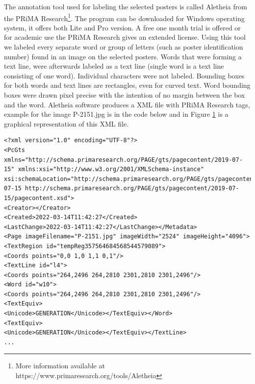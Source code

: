 The annotation tool used for labeling the selected posters is called Aletheia from the PRiMA Research\footnote{More information available at https://www.primaresearch.org/tools/Aletheia}. The program can be downloaded for Windows operating system, it offers both Lite and Pro version. A free one month trial is offered or for academic use the PRiMA Research gives an extended license. Using this tool we labeled every separate word or group of letters (such as poster identification number) found in an image on the selected posters. Words that were forming a text line, were afterwards labeled as a text line (single word is a text line consisting of one word). Individual characters were not labeled. Bounding boxes for both words and text lines are rectangles, even for curved text. Word bounding boxes were drawn pixel precise with the intention of no margin between the box and the word. Aletheia software produces a XML file with PRiMA Research tags, example for the image P-2151.jpg is in the code below and in Figure \ref{Im:aletheia} is a graphical representation of this XML file.

\begin{lstlisting}[label=lst:xml]
<?xml version="1.0" encoding="UTF-8"?>
<PcGts xmlns="http://schema.primaresearch.org/PAGE/gts/pagecontent/2019-07-15" xmlns:xsi="http://www.w3.org/2001/XMLSchema-instance" xsi:schemaLocation="http://schema.primaresearch.org/PAGE/gts/pagecontent/2019-07-15 http://schema.primaresearch.org/PAGE/gts/pagecontent/2019-07-15/pagecontent.xsd">
<Creator></Creator>
<Created>2022-03-14T11:42:27</Created>
<LastChange>2022-03-14T11:42:27</LastChange></Metadata>
<Page imageFilename="P-2151.jpg" imageWidth="2524" imageHeight="4096">
<TextRegion id="tempReg357564684568544579089">
<Coords points="0,0 1,0 1,1 0,1"/>
<TextLine id="l4">
<Coords points="264,2496 264,2810 2301,2810 2301,2496"/>
<Word id="w10">
<Coords points="264,2496 264,2810 2301,2810 2301,2496"/>
<TextEquiv>
<Unicode>GENERATION</Unicode></TextEquiv></Word>
<TextEquiv>
<Unicode>GENERATION</Unicode></TextEquiv></TextLine>
...
\end{lstlisting}


\begin{figure}[hbtp!]
    \centering
    \caption{}
    \label{Im:aletheia}
\end{figure}









